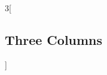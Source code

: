 \documentclass{article}
\begin{document}
\begin{multicols}{3}[\subsection{Three Columns}]
\lipsum[4-6]
\end{multicols}
\clearpage
\newpage




\end{document}
